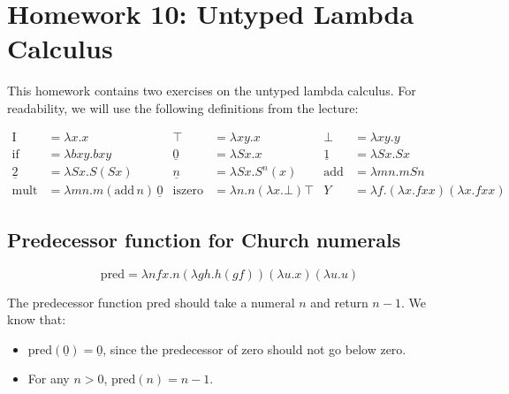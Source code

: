 \newcommand{\PRED}{\ensuremath{\mbox{pred}}}
\newcommand{\FACT}{\ensuremath{\mbox{fact}}}
\newcommand{\ID}{\ensuremath{\mbox{I}}}
\newcommand{\IF}{\ensuremath{\mbox{if}}}
\newcommand{\ADD}{\ensuremath{\mbox{add}}}
\newcommand{\MULT}{\ensuremath{\mbox{mult}}}
\newcommand{\ISZERO}{\ensuremath{\mbox{iszero}}}
\newcommand{\CN}[1]{\ensuremath{\underline{#1}}}
\newcommand{\Y}{\ensuremath{Y}}
\newcommand{\ZERO}{\CN{0}}
\newcommand{\ONE}{\CN{1}}
\newcommand{\TWO}{\CN{2}}
\newcommand{\LAM}[2]{\ensuremath{\lambda #1.#2}}


\section{Homework 10: Untyped Lambda Calculus}

This homework contains two exercises on the untyped lambda calculus. For readability,
we will use the following definitions from the lecture:

\begin{align*}
\ID &= \LAM{x}{x} &\top &= \LAM{xy}{x} &\bot &= \LAM{xy}{y} \\
\IF &= \LAM{bxy}bxy &\ZERO &= \LAM{Sx}{x} &\ONE &= \LAM{Sx}{Sx} \\
\TWO &= \LAM{Sx}{S(Sx)} &\underline{n} &= \LAM{Sx}{S^n(x)} &\ADD &= \LAM{mn}{mSn} \\
\MULT &= \LAM{mn}{m(\ADD{}\, n)\,\ZERO}  &\ISZERO&=\LAM{n}{n(\LAM{x}{\bot})\top} &\Y &= \LAM{f}{(\LAM{x}{fxx})(\LAM{x}{fxx})}
\end{align*}

\subsection{Predecessor function for Church numerals}

\[
\PRED = \LAM{nfx}{n(\LAM{gh}{h(gf)})(\LAM{u}{x})(\LAM{u}{u})}
\]


The predecessor function \(\PRED\) should take a numeral \(n\) and return \(n-1\). We know that:
\begin{itemize}
  \item \(\PRED(\ZERO) = \ZERO\), since the predecessor of zero should not go below zero.
  \item For any \(n > 0\), \(\PRED(n) = n - 1\).
\end{itemize}

